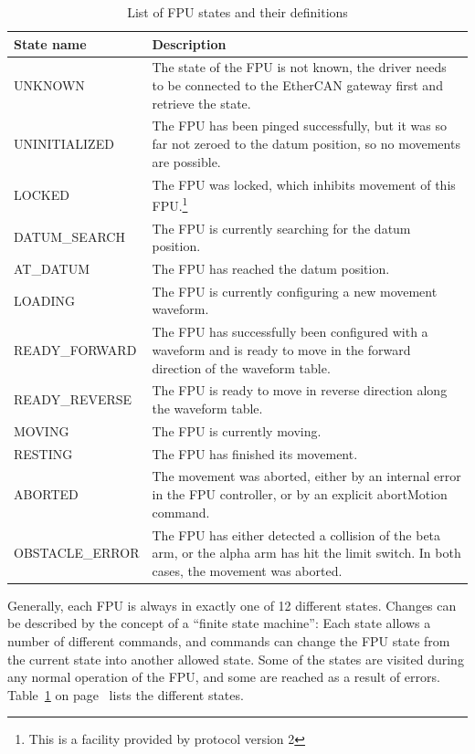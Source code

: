 \documentclass[11pt,a4paper]{scrartcl}
\begin{document}
\begin{table}
    \begin{minipage}{0.8\textwidth}
  \begin{centering}
\begin{tabular}{|l|p{}|}
  \hline
  \textbf{State name} & \textbf{Description} \\
  \hline 
UNKNOWN & The state of the FPU is not known, the driver needs to
be connected to the EtherCAN gateway first and retrieve the state.\\
\hline
UNINITIALIZED & The FPU has been pinged successfully, but it was
  so far not zeroed to the datum position, so no movements are
  possible.\\
\hline
LOCKED & The FPU was locked, which inhibits movement of this
  FPU.\footnote{This is a facility provided by protocol version 2}\\
\hline
DATUM\_SEARCH & The FPU is currently searching for the datum
position.\\
\hline
AT\_DATUM      & The FPU has reached the datum position.\\
\hline
LOADING & The FPU is currently configuring a new movement waveform.\\
\hline
READY\_FORWARD & The FPU has successfully been configured with a waveform
and is ready to move in the forward
  direction of the waveform table.\\
\hline
READY\_REVERSE& The FPU is ready to move in reverse direction along the
  waveform table.\\
\hline
MOVING        & The FPU is currently moving.\\
\hline
RESTING       & The FPU has finished its movement.\\
\hline
ABORTED & The movement was aborted, either by an internal error
  in the FPU controller, or by an explicit abortMotion command.\\
\hline
OBSTACLE\_ERROR& The FPU has either detected a collision of the
  beta arm, or the alpha arm has hit the limit switch. In both cases, the
  movement was aborted. \\
\hline
\end{tabular}
\end{centering}
\end{minipage}
\caption{List of FPU states and their definitions}
\label{tab:fpustates}
\end{table}


Generally, each FPU is always in exactly one of 12 different states.
Changes can be described by the concept of a ``finite state machine'':
Each state allows a number of different commands, and commands can
change the FPU state from the current state into another allowed
state.  Some of the states are visited during any normal operation of
the FPU, and some are reached as a result of errors.
Table~\ref{tab:fpustates} on page~\pageref{tab:fpustates} lists the
different states.
\end{document}
